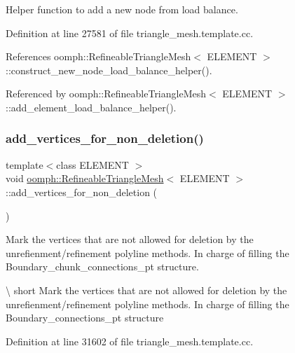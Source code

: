 Helper function to add a new node from load balance. 



Definition at line 27581 of file triangle\+\_\+mesh.\+template.\+cc.



References oomph\+::\+Refineable\+Triangle\+Mesh$<$ E\+L\+E\+M\+E\+N\+T $>$\+::construct\+\_\+new\+\_\+node\+\_\+load\+\_\+balance\+\_\+helper().



Referenced by oomph\+::\+Refineable\+Triangle\+Mesh$<$ E\+L\+E\+M\+E\+N\+T $>$\+::add\+\_\+element\+\_\+load\+\_\+balance\+\_\+helper().

\mbox{\label{classoomph_1_1RefineableTriangleMesh_ae876bda052e22ece09c21ff531aac8d2}} 
\subsubsection{\texorpdfstring{add\+\_\+vertices\+\_\+for\+\_\+non\+\_\+deletion()}{add\_vertices\_for\_non\_deletion()}}
{\footnotesize\ttfamily template$<$class E\+L\+E\+M\+E\+NT $>$ \\
void \hyperlink{classoomph_1_1RefineableTriangleMesh}{oomph\+::\+Refineable\+Triangle\+Mesh}$<$ E\+L\+E\+M\+E\+NT $>$\+::add\+\_\+vertices\+\_\+for\+\_\+non\+\_\+deletion (\begin{DoxyParamCaption}{ }\end{DoxyParamCaption})\hspace{0.3cm}{\ttfamily [protected]}}



Mark the vertices that are not allowed for deletion by the unrefienment/refinement polyline methods. In charge of filling the Boundary\+\_\+chunk\+\_\+connections\+\_\+pt structure. 

\textbackslash{} short Mark the vertices that are not allowed for deletion by the unrefienment/refinement polyline methods. In charge of filling the Boundary\+\_\+connections\+\_\+pt structure 

Definition at line 31602 of file triangle\+\_\+mesh.\+template.\+cc.



